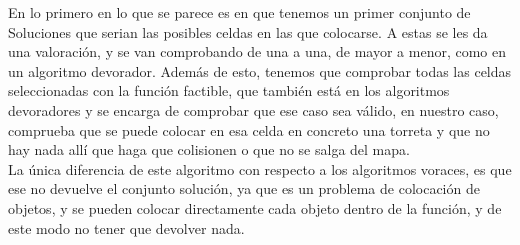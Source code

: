 En lo primero en lo que se parece es en que tenemos un primer conjunto de Soluciones que serian las posibles celdas en las que colocarse. A estas se les da una valoración, y se van comprobando de una a una, de mayor a menor, como en un algoritmo devorador. Además de esto, tenemos que comprobar todas las celdas seleccionadas con la función factible, que también está en los algoritmos devoradores y se encarga de comprobar que ese caso sea válido, en nuestro caso, comprueba que se puede colocar en esa celda en concreto una torreta y que no hay nada allí que haga que colisionen o que no se salga del mapa.\\
La única diferencia de este algoritmo con respecto a los algoritmos voraces, es que ese no devuelve el conjunto solución, ya que es un problema de colocación de objetos, y se pueden colocar directamente cada objeto dentro de la función, y de este modo no tener que devolver nada.